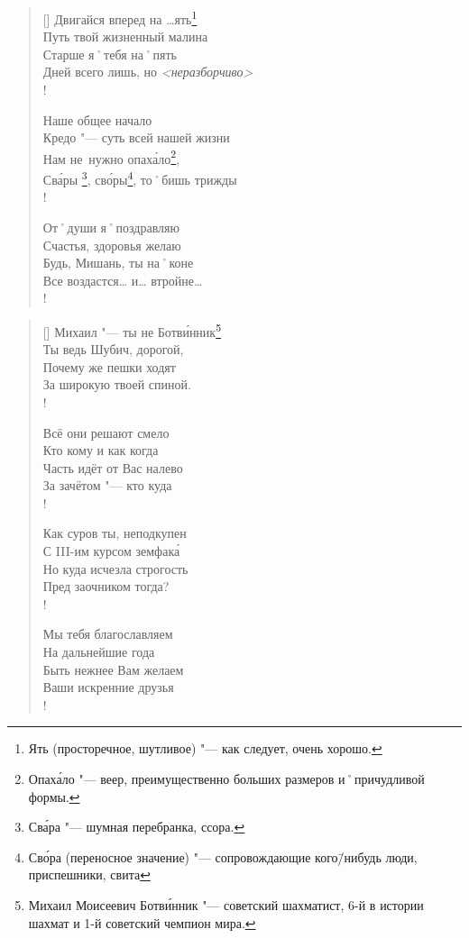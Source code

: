 \begin{verse}[\versewidth]
Двигайся вперед на …ять\footnote{Ять (просторечное, шутливое) "--- как следует, очень хорошо.}      \\
Путь твой жизненный малина     \\
Старше я˚тебя на˚пять          \\
Дней всего лишь, но \textit{<неразборчиво>}\todo[Неразборчиво]{} \\!


\vin Наше общее начало              \\
\vin Кредо "--- суть всей нашей жизни  \\
\vin Нам не~нужно опах\'{а}ло\footnote{Опах\'{а}ло "--- веер, преимущественно больших размеров и˚причудливой формы.},          \\
\vin Св\'{а}ры \footnote{Св\'{а}ра "--- шумная перебранка, ссора.}, св\'{о}ры\footnote{Св\'{о}ра (переносное значение) "--- сопровождающие кого\=/нибудь люди, приспешники, свита}, то˚бишь трижды \\!

От˚души я˚поздравляю           \\
Счастья, здоровья желаю        \\
Будь, Мишань, ты на˚коне       \\
Все воздастся… и… втройне…		\\!
\end{verse}

\clearpage							%
\settowidth{\versewidth}{Всё они решают смело}		%
\begin{verse}[\versewidth]
Михаил "--- ты не Ботв\'{и}нник\footnote{Михаил Моисеевич Ботв\'{и}нник "--- советский шахматист, 6-й в истории шахмат и 1-й советский чемпион мира.}	\\
Ты ведь Шубич, дорогой,	\\
Почему же пешки ходят	\\
За широкую твоей спиной.	\\!

\vin Всё они решают смело	\\
\vin Кто кому и как когда	\\
\vin Часть идёт от Вас налево	\\
\vin За зачётом "--- кто куда	\\!

Как суров ты, неподкупен	\\
С III-им курсом земфак\'{а}	\\
Но куда исчезла строгость	\\
Пред заочником тогда?	\\!

\vin Мы тебя благославляем	\\
\vin На дальнейшие года	\\
\vin Быть нежнее Вам желаем	\\
\vin Ваши искренние друзья	\\!
\end{verse}
